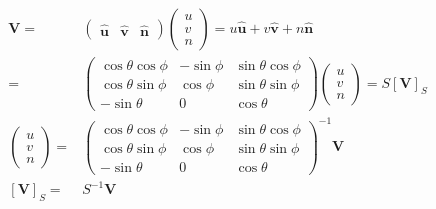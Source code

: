 \documentclass[
]{book}
\theoremstyle{definition}
\theoremstyle{definition}
\theoremstyle{definition}
\theoremstyle{definition}
\theoremstyle{remark}
\begin{document}
\[
\begin{aligned}
\boldsymbol{V}= & \begin{pmatrix}\hat{\boldsymbol{u}} & \hat{\boldsymbol{v}} & \hat{\boldsymbol{n}}\end{pmatrix}\begin{pmatrix}u\\
v\\
n
\end{pmatrix}=u\hat{\boldsymbol{u}}+v\hat{\boldsymbol{v}}+n\hat{\boldsymbol{n}}\\
= & \begin{pmatrix}\cos\theta\cos\phi & -\sin\phi & \sin\theta\cos\phi\\
\cos\theta\sin\phi & \cos\phi & \sin\theta\sin\phi\\
-\sin\theta & 0 & \cos\theta
\end{pmatrix}\begin{pmatrix}u\\
v\\
n
\end{pmatrix}=S\left[\boldsymbol{V}\right]_{S}\\
\begin{pmatrix}u\\
v\\
n
\end{pmatrix}= & \begin{pmatrix}\cos\theta\cos\phi & -\sin\phi & \sin\theta\cos\phi\\
\cos\theta\sin\phi & \cos\phi & \sin\theta\sin\phi\\
-\sin\theta & 0 & \cos\theta
\end{pmatrix}^{-1}\boldsymbol{V}\\
\left[\boldsymbol{V}\right]_{S}= & S^{-1}\boldsymbol{V}
\end{aligned}
\]
\end{document}
